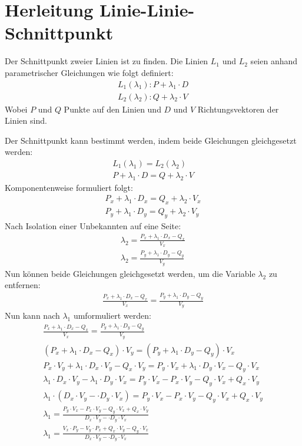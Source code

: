 \section{Herleitung Linie-Linie-Schnittpunkt}\label{anhang:herleitung:linie-linie-schnittpunkt}
Der Schnittpunkt zweier Linien ist zu finden. Die Linien $L_1$ und $L_2$ seien anhand parametrischer Gleichungen wie folgt definiert:
\begin{align}
    L_1(\lambda_1): P + \lambda_1 \cdot D\\
    L_2(\lambda_2): Q + \lambda_2 \cdot V
\end{align}
Wobei $P$ und $Q$ Punkte auf den Linien und $D$ und $V$ Richtungsvektoren der Linien sind.

Der Schnittpunkt kann bestimmt werden, indem beide Gleichungen gleichgesetzt werden:
\begin{align}
    L_1(\lambda_1) = L_2(\lambda_2)\\
    P + \lambda_1 \cdot D = Q + \lambda_2 \cdot V
\end{align}
Komponentenweise formuliert folgt:
\begin{align}
    P_x + \lambda_1 \cdot D_x = Q_x + \lambda_2 \cdot V_x\\
    P_y + \lambda_1 \cdot D_y = Q_y + \lambda_2 \cdot V_y
\end{align}
Nach Isolation einer Unbekannten auf eine Seite:
\begin{align}
    \lambda_2 = \frac{P_x + \lambda_1 \cdot D_x - Q_x}{V_x}\label{eq:event_rail_collision_lambda_2x}\\
    \lambda_2 = \frac{P_y + \lambda_1 \cdot D_y - Q_y}{V_y}\label{eq:event_rail_collision_lambda_2y}
\end{align}
Nun können beide Gleichungen gleichgesetzt werden, um die Variable $\lambda_2$ zu entfernen:
\begin{align}
    \frac{P_x + \lambda_1 \cdot D_x - Q_x}{V_x} = \frac{P_y + \lambda_1 \cdot D_y - Q_y}{V_y}
\end{align}
Nun kann nach $\lambda_1$ umformuliert werden:
\begin{align}
    \frac{P_x + \lambda_1 \cdot D_x - Q_x}{V_x} = \frac{P_y + \lambda_1 \cdot D_y - Q_y}{V_y}\\
    (P_x + \lambda_1 \cdot D_x - Q_x) \cdot V_y = (P_y + \lambda_1 \cdot D_y - Q_y) \cdot V_x\\
    P_x \cdot V_y + \lambda_1 \cdot D_x \cdot V_y - Q_x \cdot V_y = P_y \cdot V_x + \lambda_1 \cdot D_y \cdot V_x - Q_y \cdot V_x\\
    \lambda_1 \cdot D_x \cdot V_y - \lambda_1 \cdot D_y \cdot V_x = P_y \cdot V_x - P_x \cdot V_y - Q_y \cdot V_x + Q_x \cdot V_y\\
    \lambda_1 \cdot (D_x \cdot V_y - \cdot D_y \cdot V_x) = P_y \cdot V_x - P_x \cdot V_y - Q_y \cdot V_x + Q_x \cdot V_y\\
    \lambda_1 = \frac{P_y \cdot V_x - P_x \cdot V_y - Q_y \cdot V_x + Q_x \cdot V_y}{D_x \cdot V_y - \cdot D_y \cdot V_x}\\
    \lambda_1 = \frac{V_x \cdot P_y - V_y \cdot P_x + Q_x \cdot V_y - Q_y \cdot V_x}{D_x \cdot V_y - \cdot D_y \cdot V_x}\label{eq:event_rail_collision_lambda1}
\end{align}

